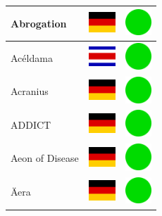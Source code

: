 \documentclass[12pt, a4paper, twoside]{report}
\begin{document}
\begin{center}
\begin{longtable}{|p{5cm}|p{2cm}|p{2cm}|}
 Abrogation                                                 & \includegraphics[width=1cm]{4x3/de} &   \includegraphics[width=1cm]{likes/y} \\ \hline
 Acéldama                                                   & \includegraphics[width=1cm]{4x3/cr} &   \includegraphics[width=1cm]{likes/y} \\ \hline
 Acranius                                                   & \includegraphics[width=1cm]{4x3/de} &   \includegraphics[width=1cm]{likes/y} \\ \hline
 ADDICT                                                     & \includegraphics[width=1cm]{4x3/de} &   \includegraphics[width=1cm]{likes/y} \\ \hline
 Aeon of Disease                                            & \includegraphics[width=1cm]{4x3/de} &   \includegraphics[width=1cm]{likes/y} \\ \hline
 Äera                                                       & \includegraphics[width=1cm]{4x3/de} &   \includegraphics[width=1cm]{likes/y} \\ \hline

\end{longtable}
\end{center}
\end{document}
